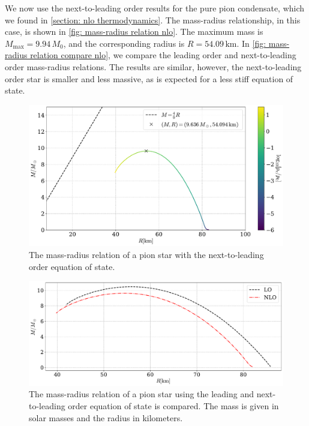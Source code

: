 We now use the next-to-leading order results for the pure pion condensate, which we found in \autoref{section: nlo thermodynamics}.
The mass-radius relationship, in this case, is shown in \autoref{fig: mass-radius relation nlo}.
The maximum mass is $M_\text{max} = 9.94\, M_0$, and the corresponding radius is $R = 54.09\,\text{km}$.
In \autoref{fig: mass-radius relation compare nlo}, we compare the leading order and next-to-leading order mass-radius relations.
The results are similar, however, the next-to-leading order star is smaller and less massive, as is expected for a less stiff equation of state.

\begin{figure}[!htb]
    \centering
    \includegraphics[width=\textwidth]{../scripts/figurer/pion_star/mass_radius_pion_star_nlo.pdf}
    \caption{The mass-radius relation of a pion star with the next-to-leading order equation of state.}
    \label{fig: mass-radius relation nlo}
\end{figure}

\begin{figure}[!htb]
    \centering
    \includegraphics[width=\textwidth]{../scripts/figurer/pion_star/mass_compare_order.pdf}
    \caption{
        The mass-radius relation of a pion star using the leading and next-to-leading order equation of state is compared. 
        The mass is given in solar masses and the radius in kilometers.}
    \label{fig: mass-radius relation compare nlo}
\end{figure}



